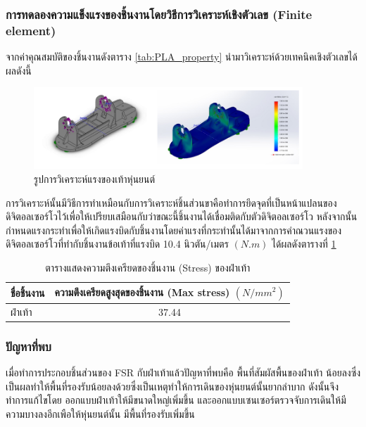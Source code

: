 \subsubsection*{การทดลองความแข็งแรงของชิ้นงานโดยวิธีการวิเคราะห์เชิงตัวเลข (Finite element)}
จากค่าคุณสมบัติของชิ้นงานดังตาราง \ref{tab:PLA_property} นำมาวิเคราะห์ด้วยเทคนิคเชิงตัวเลขได้ผลดังนี้
\begin{figure}[!ht]
  \centering
  \includegraphics[width=0.9\textwidth]{chapter4/images/FEA4.PNG}
  \caption{รูปการวิเคราะห์แรงของเท้าหุ่นยนต์}
  \label{fig:FEA4}
\end{figure}
\vspace{-15pt}
การวิเคราะห์นั้นมีวิธีการทำเหมือนกับการวิเคราะห์ชิ้นส่วนขาคือทำการยึดจุดที่เป็นหน้าแปลนของดิจิตอลเซอร์โวไว้เพื่อให้เปรียบเสมือนกับว่าขณะนี้ชิ้นงานได้เชื่อมติดกับตัวดิจิตอลเซอร์โว
หลังจากนั้นกำหนดแรงกระทำเพื่อให้เกิดแรงบิดกับชิ้นงานโดยค่าแรงที่กระทำนั้นได้มาจากการคำณวนแรงของดิจิตอลเซอร์โวที่ทำกับชิ้นงานข้อเท้าที่แรงบิด 10.4 นิวตัน/เมตร $(N.m)$
ได้ผลดังตารางที่ \ref{tab:footstress_result}

\begin{table}[!ht]
	\centering
	\begin{tabular}{| l | c |}
		\hline
		ชื่อชิ้นงาน	& ความตึงเครียดสูงสุดของชิ้นงาน (Max stress) $(N/mm^2)$ \\
        \hline
        ฝ่าเท้า & 37.44 \\
	    \hline
	\end{tabular}
	\caption{ตารางแสดงความตึงเครียดของชิ้นงาน (Stress) ของฝ่าเท้า}
	\label{tab:footstress_result}
\end{table}
\vspace{-15pt}
\subsubsection*{ปัญหาที่พบ}
เมื่อทำการประกอบชิ้นส่วนของ FSR กับฝ่าเท้าแล้วปัญหาที่พบคือ พื้นที่สัมผัสพื้นของฝ่าเท้า
น้อยลงซึ่งเป็นผลทำให้พื้นที่รองรับน้อยลงด้วยซึ่งเป็นเหตุทำให้การเดินของหุ่นยนต์นั้นยากลำบาก ดังนั้นจึงทำการแก้ไขโดย ออกแบบฝ่าเท้าให้มีขนาดใหญ่เพิ่มขึ้น และออกแบบเซนเซอร์ตรวจจับการเดินให้มีความบางลงอีกเพือให้หุ่นยนต์นั้น
มีพื้นที่รองรับเพิ่มขึ้น

